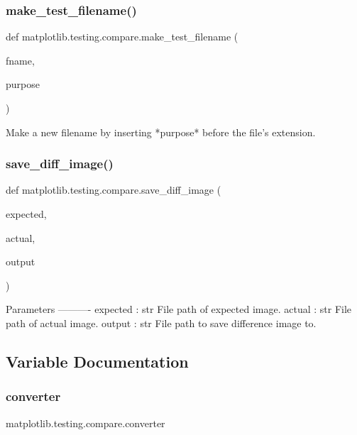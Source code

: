 \subsubsection{\texorpdfstring{make\+\_\+test\+\_\+filename()}{make\_test\_filename()}}
{\footnotesize\ttfamily def matplotlib.\+testing.\+compare.\+make\+\_\+test\+\_\+filename (\begin{DoxyParamCaption}\item[{}]{fname,  }\item[{}]{purpose }\end{DoxyParamCaption})}

\begin{DoxyVerb}Make a new filename by inserting *purpose* before the file's extension.
\end{DoxyVerb}
 \mbox{\label{namespacematplotlib_1_1testing_1_1compare_ab116a8a80cb7cbb6705b679fc2ba6b6b}} 
\subsubsection{\texorpdfstring{save\+\_\+diff\+\_\+image()}{save\_diff\_image()}}
{\footnotesize\ttfamily def matplotlib.\+testing.\+compare.\+save\+\_\+diff\+\_\+image (\begin{DoxyParamCaption}\item[{}]{expected,  }\item[{}]{actual,  }\item[{}]{output }\end{DoxyParamCaption})}

\begin{DoxyVerb}Parameters
----------
expected : str
    File path of expected image.
actual : str
    File path of actual image.
output : str
    File path to save difference image to.
\end{DoxyVerb}
 

\subsection{Variable Documentation}
\mbox{\label{namespacematplotlib_1_1testing_1_1compare_af172c07fb213547199bf93cd4ca94f6c}} 
\subsubsection{\texorpdfstring{converter}{converter}}
{\footnotesize\ttfamily matplotlib.\+testing.\+compare.\+converter}


